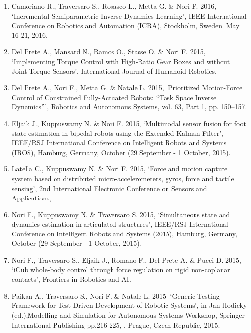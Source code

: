 \begin{enumerate}
\item Camoriano R., Traversaro S., Rosasco L., Metta G. \& Nori F. 2016, ‘Incremental Semiparametric Inverse Dynamics Learning’, IEEE International Conference on Robotics and Automation (ICRA), Stockholm, Sweden, May 16-21, 2016.

\item Del Prete A., Mansard N., Ramos O., Stasse O. \& Nori F. 2015, ‘Implementing Torque Control with High-Ratio Gear Boxes and without Joint-Torque Sensors’, International Journal of Humanoid Robotics.

\item Del Prete A., Nori F., Metta G. \& Natale L. 2015, ‘Prioritized Motion-Force Control of Constrained Fully-Actuated Robots: “Task Space Inverse Dynamics”’, Robotics and Autonomous Systems, vol. 63, Part 1, pp. 150–157.

\item Eljaik J., Kuppuswamy N. \& Nori F. 2015, ‘Multimodal sensor fusion for foot state estimation in bipedal robots using the Extended Kalman Filter’, IEEE/RSJ International Conference on Intelligent Robots and Systems (IROS), Hamburg, Germany, October (29 September - 1 October, 2015).

\item Latella C., Kuppuswamy N. \& Nori F. 2015, ‘Force and motion capture system based on distributed micro-accelerometers, gyros, force and tactile sensing’, 2nd International Electronic Conference on Sensors and Applications,.

\item Nori F., Kuppuswamy N. \& Traversaro S. 2015, ‘Simultaneous state and dynamics estimation in articulated structures’, IEEE/RSJ International Conference on Intelligent Robots and Systems (2015), Hamburg, Germany, October (29 September - 1 October, 2015).

\item Nori F., Traversaro S., Eljaik J., Romano F., Del Prete A. \& Pucci D. 2015, ‘iCub whole-body control through force regulation on rigid non-coplanar contacts’, Frontiers in Robotics and AI.

\item Paikan A., Traversaro S., Nori F. \& Natale L. 2015, ‘Generic Testing Framework for Test Driven Development of Robotic Systems’, in Jan Hodicky (ed.),Modelling and Simulation for Autonomous Systems Workshop, Springer International Publishing pp.216-225, , Prague, Czech Republic, 2015.


\end{enumerate}
